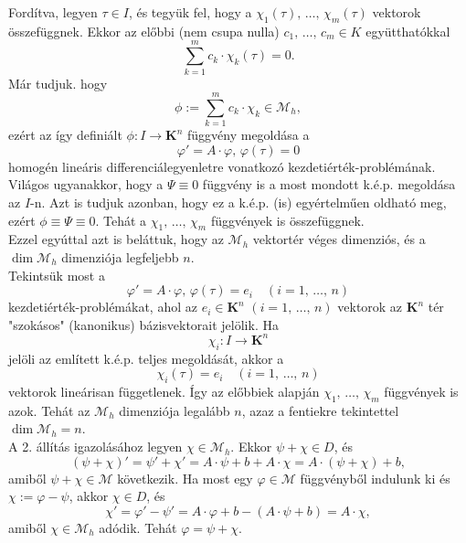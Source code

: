 \documentclass{article}
\newcommand{\K}{\mathbf{K}}
\begin{document}
	Fordítva, legyen $\tau \in I$, és tegyük fel, hogy a $\chi_1(\tau), \, \dots, \, \chi_m(\tau)$ vektorok összefüggnek. Ekkor az előbbi (nem csupa nulla) $c_1, \, \dots, \, c_m \in K$ együtthatókkal
	\[
		\sum_{k=1}^m c_k \cdot \chi_k(\tau) = 0.
	\]
	Már tudjuk. hogy
	\[
		\phi := \sum_{k=1}^m c_k \cdot \chi_k \in \mathcal{M}_h,
	\]
	ezért az így definiált $\phi : I \to \K^n$ függvény megoldása a
	\[
		\varphi' = A \cdot \varphi, \, \varphi(\tau) = 0
	\]
	homogén lineáris differenciálegyenletre vonatkozó kezdetiérték-problémának. Világos ugyanakkor, hogy a $\Psi \equiv 0$ függvény is a most mondott k.é.p. megoldása az $I$-n. Azt is tudjuk azonban, hogy ez a k.é.p. (is) egyértelműen oldható meg, ezért $\phi \equiv \Psi \equiv 0$. Tehát a $\chi_1, \, \dots, \, \chi_m$ függvények is összefüggnek.\\
	
	Ezzel egyúttal azt is beláttuk, hogy az $\mathcal{M}_h$ vektortér véges dimenziós, és a $\dim \mathcal{M}_h$ dimenziója legfeljebb $n$.\\
	
	Tekintsük most a 
	\[
		\varphi' = A \cdot \varphi, \, \varphi(\tau) = e_i \quad (i = 1, \, \dots, \, n)
	\]
	kezdetiérték-problémákat, ahol az $e_i \in \K^n$ $(i = 1, \, \dots, \, n)$ vektorok az $\K^n$ tér "szokásos" (kanonikus) bázisvektorait jelölik. Ha
	\[
		\chi_i : I \to \K^n
	\]
	jelöli az említett k.é.p. teljes megoldását, akkor a
	\[
		\chi_i(\tau) = e_i \quad (i = 1, \, \dots, \, n)
	\]
	vektorok lineárisan függetlenek. Így az előbbiek alapján $\chi_1, \, \dots, \, \chi_m$ függvények is azok. Tehát az $\mathcal{M}_h$ dimenziója legalább $n$, azaz a fentiekre tekintettel $\dim \mathcal{M}_h = n$.\\
	
	A 2. állítás igazolásához legyen $\chi \in \mathcal{M}_h$. Ekkor $\psi + \chi \in D$, és
	\[
		(\psi + \chi)' = \psi' + \chi' = A \cdot \psi + b + A \cdot \chi = A \cdot (\psi + \chi) + b,
	\]
	amiből $\psi + \chi \in \mathcal{M}$ következik. Ha most egy $\varphi \in \mathcal{M}$ függvényből indulunk ki és $\chi := \varphi - \psi$, akkor $\chi \in D$, és
	\[
		\chi' = \varphi' - \psi' = A \cdot \varphi + b - (A \cdot \psi + b) = A \cdot \chi,
	\]
	amiből $\chi \in \mathcal{M}_h$ adódik. Tehát $\varphi = \psi + \chi$.\\
	
\end{document}
